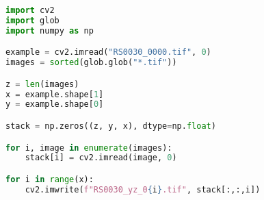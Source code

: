\begin{lstlisting}[float={ht},caption={This is an example of a listing.},label={lst:orientation},language=Python,upquote=true]
import cv2
import glob
import numpy as np

example = cv2.imread("RS0030_0000.tif", 0)
images = sorted(glob.glob("*.tif"))

z = len(images)
x = example.shape[1]
y = example.shape[0]

stack = np.zeros((z, y, x), dtype=np.float)

for i, image in enumerate(images):
    stack[i] = cv2.imread(image, 0)

for i in range(x):
    cv2.imwrite(f"RS0030_yz_0{i}.tif", stack[:,:,i])
\end{lstlisting}